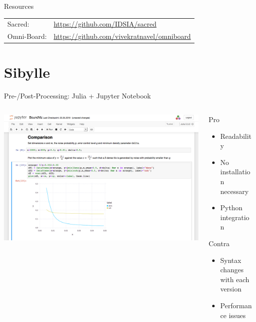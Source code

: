 \documentclass[aspectratio=169,10pt]{beamer}
\begin{document}
\begin{frame}[fragile]{Resources}
\begin{tabular}{ll}
    Sacred:&\url{https://github.com/IDSIA/sacred}\\
    Omni-Board:& \url{https://github.com/vivekratnavel/omniboard}\\
\end{tabular}
\end{frame}

\section{Sibylle}
\begin{frame}[fragile]{Pre-/Post-Processing: Julia + Jupyter Notebook}
\begin{columns}
\begin{column}{0.7\textwidth}
\includegraphics[width=\textwidth]{img/sibyJuliaNotebook.png}
\end{column}
\begin{column}{0.25\textwidth}
\begin{alertblock}{Pro}
\begin{itemize}
    \item Readability
    \item No installation necessary
    \item Python integration
\end{itemize}
\end{alertblock}
\begin{block}{Contra}
\begin{itemize}
    \item Syntax changes with each version
    \item Performance issues
\end{itemize}
\end{block}
\end{column}
\end{columns}
\end{frame}
\end{document}
